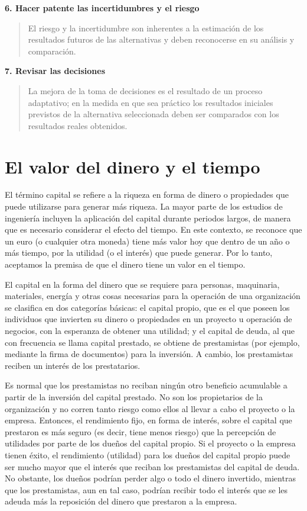 \documentclass[
]{krantz}
\begin{document}
\textbf{6. Hacer patente las incertidumbres y el riesgo}

\begin{quote}
El riesgo y la incertidumbre son inherentes a la estimación de los resultados futuros de las alternativas y deben reconocerse en su análisis y comparación.
\end{quote}

\textbf{7. Revisar las decisiones}

\begin{quote}
La mejora de la toma de decisiones es el resultado de un proceso adaptativo; en la medida en que sea práctico los resultados iniciales previstos de la alternativa seleccionada deben ser comparados con los resultados reales obtenidos.
\end{quote}

\hypertarget{el-valor-del-dinero-y-el-tiempo}{%
\chapter{El valor del dinero y el tiempo}\label{el-valor-del-dinero-y-el-tiempo}}

El término capital se refiere a la riqueza en forma de dinero o propiedades que puede utilizarse para generar más riqueza. La mayor parte de los estudios de ingeniería incluyen la aplicación del capital durante periodos largos, de manera que es necesario considerar el efecto del tiempo. En este contexto, se reconoce que un euro (o cualquier otra moneda) tiene más valor hoy que dentro de un año o más tiempo, por la utilidad (o el interés) que puede generar. Por lo tanto, aceptamos la premisa de que el dinero tiene un valor en el tiempo.

El capital en la forma del dinero que se requiere para personas, maquinaria, materiales, energía y otras cosas necesarias para la operación de una organización se clasifica en dos categorías básicas: el capital propio, que es el que poseen los individuos que invierten su dinero o propiedades en un proyecto u operación de negocios, con la esperanza de obtener una utilidad; y el capital de deuda, al que con frecuencia se llama capital prestado, se obtiene de prestamistas (por ejemplo, mediante la firma de documentos) para la inversión. A cambio, los prestamistas reciben un interés de los prestatarios.

Es normal que los prestamistas no reciban ningún otro beneficio acumulable a partir de la inversión del capital prestado. No son los propietarios de la organización y no corren tanto riesgo como ellos al llevar a cabo el proyecto o la empresa. Entonces, el rendimiento fijo, en forma de interés, sobre el capital que prestaron es más seguro (es decir, tiene menos riesgo) que la percepción de utilidades por parte de los dueños del capital propio. Si el proyecto o la empresa tienen éxito, el rendimiento (utilidad) para los dueños del capital propio puede ser mucho mayor que el interés que reciban los prestamistas del capital de deuda. No obstante, los dueños podrían perder algo o todo el dinero invertido, mientras que los prestamistas, aun en tal caso, podrían recibir todo el interés que se les adeuda más la reposición del dinero que prestaron a la empresa.
\end{document}

